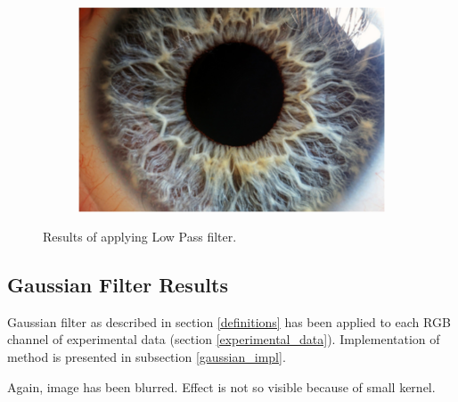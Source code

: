 \documentclass{article}
\begin{document}
\begin{figure}[H]
\begin{subfigure}{.09\textwidth}
\end{subfigure}%
\begin{subfigure}{.47\textwidth}
  \centering
  \includegraphics[width=0.97\linewidth]{_Figures/raw_data_4_lowpass.png}
  \caption{}
  \label{fig:raw_4_lowpass}
\end{subfigure}

\caption{Results of applying Low Pass filter. }
\label{fig:lowhpass_results}
\end{figure}


%
%
\newpage
\subsection{Gaussian Filter Results}
Gaussian filter as described in section \ref{definitions} has been applied to each RGB channel of experimental data (section \ref{experimental_data}). Implementation of method is presented in subsection \ref{gaussian_impl}.

Again, image has been blurred. Effect is not so visible because of small kernel.
\end{document}
